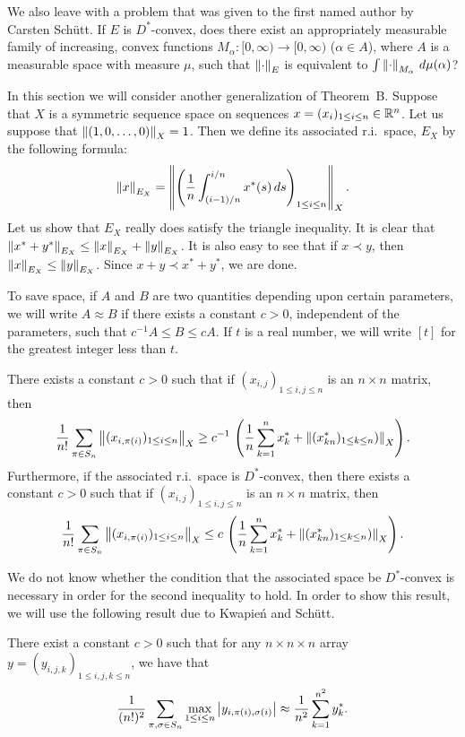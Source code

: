 We also leave with a problem that was given to the first named author
by
Carsten Sch\"utt.
If $E$ is $D^*$-convex, does there exist an
appropriately measurable
family
of increasing, convex functions
$M_\alpha:[0,\infty) \to [0,\infty)$ ($\alpha\in A$), where $A$
is a measurable space with measure $\mu$,
such that
$\left\|\cdot\right\|_E$ is equivalent to
$\int \left\|\cdot\right\|_{M_\alpha} \, d\mu(\alpha)$?


\endhead
%
In this section we will consider another generalization of Theorem~B.
Suppose that $X$ is a symmetric sequence space on sequences
$x = (x_i)_{1\le i \le n} \in {\Bbb R}^n$.
Let us suppose that $\left\|(1,0,\dots,0)\right\|_X = 1$.
Then we define its associated
r.i.\ space, $E_X$ by the following formula:
$$ \left\|x\right\|_{E_X}
   =
   \left\| \left( {1\over n} \int_{(i-1)/n}^{i/n} x^*(s) \, ds \right)
   _{1\le i \le n} \right\|_X .$$
Let us show that $E_X$ really does satisfy the triangle inequality.  It
is clear that $\left\|x^*+y^*\right\|_{E_X} \le \left\|x\right\|_{E_X} + \left\|y\right\|_{E_X}$.
It is also easy to see that if $x\prec y$, then $\left\|x\right\|_{E_X} \le
\left\|y\right\|_{E_X}$.  Since $x+y \prec x^* + y^*$, we are done.

To save space, if $A$ and $B$ are two quantities
depending upon certain parameters, we will write
$A \approx B$ if there exists a constant $c>0$, independent of the
parameters, such that $c^{-1} A \le B \le c A$.  If $t$ is a real number,
we will write $[t]$ for the greatest integer less than $t$.

There exists a constant $c>0$
such that
if $(x_{i,j})_{1\le i,j \le n}$ is an $n\times
n$ matrix, then
$$ {1\over n!} \sum_{\pi \in S_n}
   \left\|(x_{i,\pi(i)})_{1\le i \le n}\right\|_X
   \ge
   c^{-1} \, \left(
   {1\over n} \sum_{k=1}^n x^*_k
   + \left\|(x^*_{kn})_{1\le k\le n})\right\|_X
   \right) .$$
Furthermore, if the associated r.i.\ space is $D^*$-convex, then
there exists a constant $c>0$
such that
if $(x_{i,j})_{1\le i,j \le n}$ is an $n\times
n$ matrix, then
$$ {1\over n!} \sum_{\pi \in S_n}
   \left\|(x_{i,\pi(i)})_{1\le i \le n}\right\|_X
   \le
   c \, \left(
   {1\over n} \sum_{k=1}^n x^*_k
   + \left\|(x^*_{kn})_{1\le k\le n})\right\|_X
   \right) .$$
\endproclaim

We do not know whether the condition that the associated space be
$D^*$-convex is necessary in order for the second inequality to hold.
In order to show this result, we will use the following result due to
Kwapie\'n and Sch\"utt.

  There exist a constant $c>0$ such that
for any $n\times n\times n$ array $y = (y_{i,j,k})_{1\le i,j,k \le n}$,
we have that
$$ {1\over (n!)^2} \sum_{\pi,\sigma \in S_n}
   \max_{1 \le i \le n} \left| y_{i,\pi(i),\sigma(i)} \right|
   \approx
   {1 \over n^2} \sum_{k=1}^{n^2} y_k^* .$$
\endproclaim

